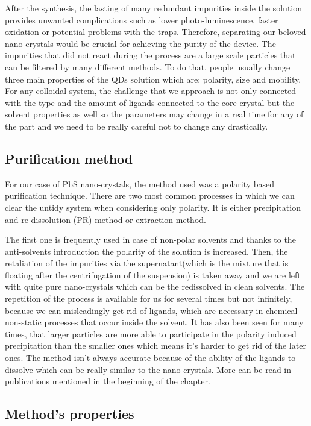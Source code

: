 After the synthesis, the lasting of many redundant impurities inside the solution provides unwanted complications such as lower photo-luminescence, faster oxidation or potential problems with the traps. Therefore, separating our beloved nano-crystals would be crucial for achieving the purity of the device. The  impurities that did not react during the process are a large scale particles that can be  filtered by many different methods. \cite{Shen2017}\cite{purif} To do that, people usually change three main properties of the QDs solution which are: polarity, size and mobility. For any colloidal system, the challenge that we approach is not only connected with the type and the amount of ligands connected to the core crystal but the solvent properties as well so the parameters may change in a real time for any of the part and we need to be really careful not to change any drastically. 

\subsection{Purification method}

For our case of PbS nano-crystals, the method used was a polarity based purification technique. There are two most common processes in which we can clear the untidy system when considering only polarity. It is either precipitation and re-dissolution (PR) method or extraction method. 

The first one is frequently used in case of non-polar solvents and thanks to the anti-solvents introduction the polarity of the solution is increased. Then, the retaliation of the impurities via the supernatant(which is the mixture that is floating after the centrifugation of the suspension) is taken away and we are left with quite pure nano-crystals which can be the redissolved in clean solvents. The repetition of the process is available for us for several times but not infinitely, because we can misleadingly get rid of ligands, which are necessary in chemical non-static processes that occur inside the solvent. It has also been seen for many times, that larger particles are more able to participate in the polarity induced precipitation than the smaller ones which means it's harder to get rid of the later ones. The method isn't always accurate because of the ability of the ligands to dissolve which can be really similar to the nano-crystals. More can be read in publications mentioned in the beginning of the chapter.
\vline

\subsection{Method's properties}

